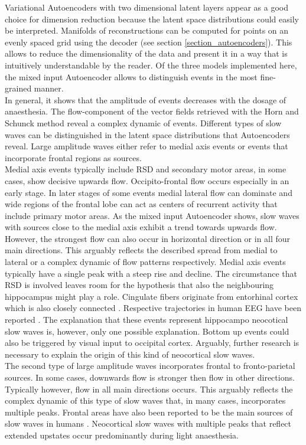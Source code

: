 Variational Autoencoders with two dimensional latent layers appear as a good choice for dimension reduction because the latent space distributions could easily be interpreted. Manifolds of reconstructions can be computed for points on an evenly spaced grid using the decoder (see section \ref{section_autoencoders}). This allows to reduce the dimensionality of the data and present it in a way that is intuitively understandable by the reader. Of the three models implemented here, the mixed input Autoencoder allows to distinguish events in the most fine-grained manner.\\
In general, it shows that the amplitude of events decreases with the dosage of anaesthesia. The flow-component of the vector fields retrieved with the Horn and Schunck method reveal a complex dynamic of events. Different types of slow waves can be distinguished in the latent space distributions that Autoencoders reveal. Large amplitude waves either refer to medial axis events or events that incorporate frontal regions as sources.\\
Medial axis events typically include RSD and secondary motor areas, in some cases, show decisive upwards flow. Occipito-frontal flow occurs especially in an early stage. In later stages of some events medial lateral flow can dominate and wide regions of the frontal lobe can act as centers of recurrent activity that include primary motor areas. As the mixed input Autoencoder shows, slow waves with sources close to the medial axis exhibit a trend towards upwards flow. However, the strongest flow can also occur in horizontal direction or in all four main directions. This arguably reflects the described spread from medial to lateral or a complex dynamic of flow patterns respectively. Medial axis events typically have a single peak with a steep rise and decline. The circumstance that RSD is involved leaves room for the hypothesis that also the neighbouring hippocampus might play a role. Cingulate fibers originate from entorhinal cortex which is also closely connected \parencite{milczarek2018spatial}. Respective trajectories in human EEG have been reported \parencite{murphy2009source}. The explanation that these events represent hippocampo neocotical slow waves is, however, only one possible explanation. Bottom up events could also be triggered by visual input to occipital cortex. Arguably, further research is necessary to explain the origin of this kind of neocortical slow waves.\\
The second type of large amplitude waves incorporates frontal to fronto-parietal sources. In some cases, downwards flow is stronger then flow in other directions. Typically however, flow in all main directions occurs. This arguably reflects the complex dynamic of this type of slow waves that, in many cases, incorporates multiple peaks. Frontal areas have also been reported to be the main sources of slow waves in humans \parencite[p. 1110]{brown2012control}. Neocortical slow waves with multiple peaks that reflect extended upstates occur predominantly during light anaesthesia.\\
